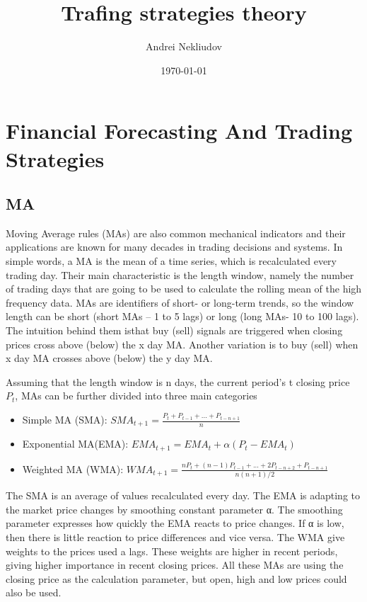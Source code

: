 \documentclass[12pt]{article}
\title{Trafing strategies theory}
\author{Andrei Nekliudov}
\date{\today}
\begin{document}
	
	\maketitle
	
	\section{Financial Forecasting And Trading Strategies}
	\subsection{MA}
		Moving Average rules (MAs) are also common mechanical indicators and their applications are
		known for many decades in trading decisions and systems. In simple words, a MA is the mean of a
		time series, which is recalculated every trading day. Their main characteristic is the length window,
		namely the number of trading days that are going to be used to calculate the rolling mean of the
		high frequency data. MAs are identifiers of short- or long-term trends, so the window length can be
		short (short MAs – 1 to 5 lags) or long (long MAs- 10 to 100 lags). The intuition behind them isthat buy (sell) signals are triggered when closing prices cross above (below) the x day MA. Another
		variation is to buy (sell) when x day MA crosses above (below) the y day MA.
		
		Assuming that the length window is n days, the current period’s t closing price $P_t$, MAs can be
		further divided into three main categories
		
		\begin{itemize}
			\item Simple MA (SMA): $SMA_{t+1} = \frac{P_t + P_{t-1} + ... + P_{t-n + 1}}{n}$
			
			\item Exponential MA(EMA): $EMA_{t+1} = EMA_t + \alpha(P_t - EMA_t)$
			
			\item Weighted MA (WMA): $WMA_{t + 1} = \frac{nP_t + (n-1)P_{t - 1} + ... + 2P_{t - n + 2} + P_{t-n+1}}{n(n + 1) / 2}$
		\end{itemize}
	
	The SMA is an average of values recalculated every day. The EMA is adapting to the market price
	changes by smoothing constant parameter α. The smoothing parameter expresses how quickly the
	EMA reacts to price changes. If α is low, then there is little reaction to price differences and vice
	versa. The WMA give weights to the prices used a lags. These weights are higher in recent periods,
	giving higher importance in recent closing prices. All these MAs are using the closing price as the
	calculation parameter, but open, high and low prices could also be used.
\end{document}
